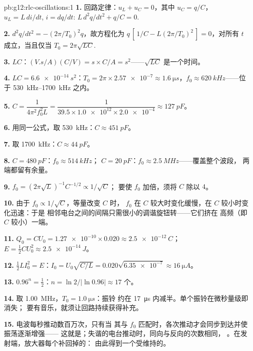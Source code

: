 \begin{solution}{pb:g12:rlc-oscillations:1}
\textbf{1.} 回路定律：$u_L + u_C = 0$，其中 $u_C = q/C$，
$u_L = L\,di/dt$, $i = dq/dt$: $L\,d^2q/dt^2 + q/C = 0$.

\textbf{2.} $d^2q/dt^2 = -(2\pi/T_0)^2 q$，故方程化为
$q\,[\,1/C - L(2\pi/T_0)^2\,] = 0$，对所有 $t$ 成立，当且仅当
$T_0 = 2\pi\sqrt{LC}$.

\textbf{3.} $LC$：$(\unit{V.s/A})(\unit{C/V}) = \unit{s} \times
\unit{C/A} = \unit{s^2}$——$\sqrt{LC}$ 是一个时间。

\textbf{4.} $LC = \qty{6.6e-14}{s^2}$：$T_0 = 2\pi \times \num{2.57e-7}
\approx \qty{1.6}{\micro s}$，$f_0 \approx \qty{620}{kHz}$——位于
\qtyrange{530}{1700}{kHz} 之内。

\textbf{5.} $C = \dfrac{1}{4\pi^2 f_0^2 L} = \dfrac{1}{39.5 \times
\num{1.0e12} \times \num{2.0e-4}} \approx \qty{127}{pF}$。

\textbf{6.} 用同一公式，取 \qty{530}{kHz}：$C \approx \qty{451}{pF}$。

\textbf{7.} 取 \qty{1700}{kHz}：$C \approx \qty{44}{pF}$。

\textbf{8.} $C = \qty{480}{pF}$：$f_0 \approx \qty{514}{kHz}$；
$C = \qty{20}{pF}$：$f_0 \approx \qty{2.5}{MHz}$——覆盖整个波段，
两端都留有余量。

\textbf{9.} $f_0 = (2\pi\sqrt{L})^{-1}C^{-1/2} \propto 1/\sqrt{C}$；
要使 $f_0$ 加倍，须将 $C$ 除以 $4$。

\textbf{10.} 由于 $f_0 \propto 1/\sqrt{C}$，等量改变 $C$ 时，
$f_0$ 在 $C$ 较大时变化缓慢，在 $C$ 较小时变化迅速：于是
相邻电台之间的间隔只需很小的调谐旋钮转——它们挤在
高频（即 $C$ 较小）一端。

\textbf{11.} $Q_0 = CU_0 = \num{1.27e-10} \times 0.020 \approx
\qty{2.5e-12}{C}$；$E = \tfrac12 CU_0^2 \approx \qty{2.5e-14}{J}$。

\textbf{12.} $\tfrac12 LI_0^2 = E$：$I_0 = U_0\sqrt{C/L} =
0.020\sqrt{\num{6.35e-7}} \approx \qty{16}{\micro A}$。

\textbf{13.} $0.96^n = \tfrac12$：$n = \ln 2/\lvert\ln 0.96\rvert
\approx 17$ 个。

\textbf{14.} 取 \qty{1.00}{MHz}，$T_0 = \qty{1.0}{\micro s}$：振铃
约在 \qty{17}{\micro s} 内减半。单个振铃在微秒量级即消失；
要有音乐，就须让回路持续获得补充。

\textbf{15.} 电波每秒推动数百万次，只有当
其与 $f_0$ 匹配时，各次推动才会同步到达并使振荡逐渐增强——
这就是；失谐的电台推动时，同向与反向的次数相同，
。在发射端，放大器每个补回掉的：
由此得到一个受维持的。


\end{solution}
